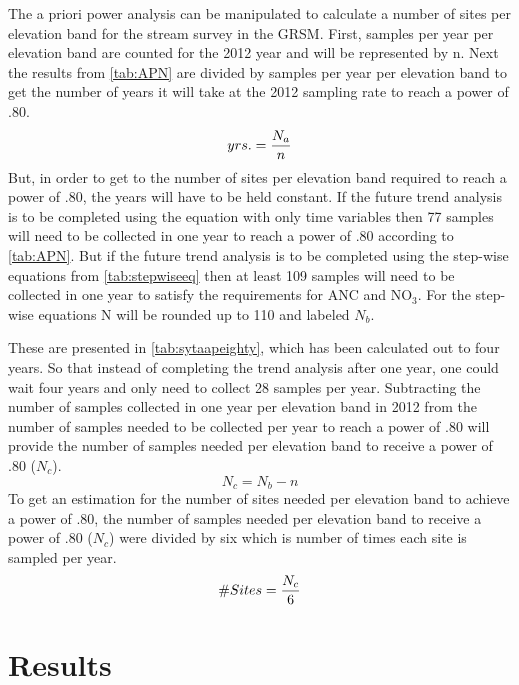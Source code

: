 The a priori power analysis can be manipulated to calculate a number of sites per elevation band for the stream survey in the GRSM.
First, samples per year per elevation band are counted for the 2012 year and will be represented by n.
Next the results from \autoref{tab:APN} are divided by samples per year per elevation band to get the number of years it will take at the 2012 sampling rate to reach a power of .80.
\begin{equation}
	yrs. = {N_a \over n}
\end{equation}
But, in order to get to the number of sites per elevation band required to reach a power of .80, the years will have to be held constant.
If the future trend analysis is to be completed using the equation with only time variables then 77 samples will need to be collected in one year to reach a power of .80 according to \autoref{tab:APN}.
But if the future trend analysis is to be completed using the step-wise equations from \autoref{tab:stepwiseeq} then at least 109 samples will need to be collected in one year to satisfy the requirements for ANC and NO$_3$.
For the step-wise equations N will be rounded up to 110 and labeled $N_b$.

These are presented in \autoref{tab:sytaapeighty}, which has been calculated out to four years.
So that instead of completing the trend analysis after one year, one could wait four years and only need to collect 28 samples per year.
Subtracting the number of samples collected in one year per elevation band in 2012 from the number of samples needed to be collected per year to reach a power of .80 will provide the number of samples needed per elevation band to receive a power of .80 ($N_c$).
\begin{equation}
	N_c={N_b - n}
\end{equation}
To get an estimation for the number of sites needed per elevation band to achieve a power of .80, the number of samples needed per elevation band to receive a power of .80 ($N_c$) were divided by six which is number of times each site is sampled per year.
\begin{equation}
	\#Sites = {N_c \over 6}
\end{equation}

\section{Results}
